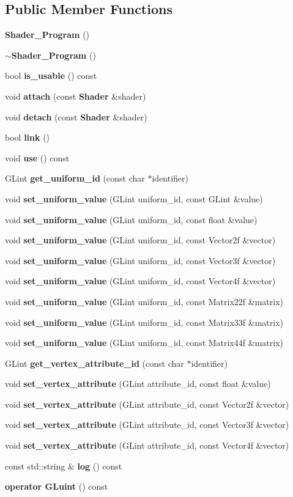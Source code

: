 \subsection*{Public Member Functions}
\begin{DoxyCompactItemize}
\item 
\textbf{ Shader\+\_\+\+Program} ()
\item 
\textbf{ $\sim$\+Shader\+\_\+\+Program} ()
\item 
bool \textbf{ is\+\_\+usable} () const
\item 
void \textbf{ attach} (const \textbf{ Shader} \&shader)
\item 
void \textbf{ detach} (const \textbf{ Shader} \&shader)
\item 
bool \textbf{ link} ()
\item 
void \textbf{ use} () const
\item 
G\+Lint \textbf{ get\+\_\+uniform\+\_\+id} (const char $\ast$identifier)
\item 
void \textbf{ set\+\_\+uniform\+\_\+value} (G\+Lint uniform\+\_\+id, const G\+Lint \&value)
\item 
void \textbf{ set\+\_\+uniform\+\_\+value} (G\+Lint uniform\+\_\+id, const float \&value)
\item 
void \textbf{ set\+\_\+uniform\+\_\+value} (G\+Lint uniform\+\_\+id, const Vector2f \&vector)
\item 
void \textbf{ set\+\_\+uniform\+\_\+value} (G\+Lint uniform\+\_\+id, const Vector3f \&vector)
\item 
void \textbf{ set\+\_\+uniform\+\_\+value} (G\+Lint uniform\+\_\+id, const Vector4f \&vector)
\item 
void \textbf{ set\+\_\+uniform\+\_\+value} (G\+Lint uniform\+\_\+id, const Matrix22f \&matrix)
\item 
void \textbf{ set\+\_\+uniform\+\_\+value} (G\+Lint uniform\+\_\+id, const Matrix33f \&matrix)
\item 
void \textbf{ set\+\_\+uniform\+\_\+value} (G\+Lint uniform\+\_\+id, const Matrix44f \&matrix)
\item 
G\+Lint \textbf{ get\+\_\+vertex\+\_\+attribute\+\_\+id} (const char $\ast$identifier)
\item 
void \textbf{ set\+\_\+vertex\+\_\+attribute} (G\+Lint attribute\+\_\+id, const float \&value)
\item 
void \textbf{ set\+\_\+vertex\+\_\+attribute} (G\+Lint attribute\+\_\+id, const Vector2f \&vector)
\item 
void \textbf{ set\+\_\+vertex\+\_\+attribute} (G\+Lint attribute\+\_\+id, const Vector3f \&vector)
\item 
void \textbf{ set\+\_\+vertex\+\_\+attribute} (G\+Lint attribute\+\_\+id, const Vector4f \&vector)
\item 
const std\+::string \& \textbf{ log} () const
\item 
\textbf{ operator G\+Luint} () const
\end{DoxyCompactItemize}
